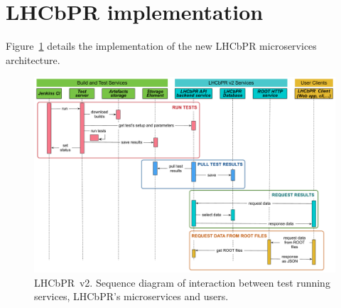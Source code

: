 \documentclass[10pt]{iopart}
\begin{document}
\section{LHCbPR implementation}\label{sec:impl}

Figure~\ref{figLHCbPR2}  details the implementation of the new LHCbPR microservices
architecture. 

\begin{figure}[H]
\begin{minipage}{\textwidth}
\includegraphics[width=\textwidth]{figs/LHCbPR2.pdf}
\caption{\label{figLHCbPR2} LHCbPR~v2. Sequence diagram of interaction between test
running services, LHCbPR's microservices and users.}
\end{minipage}
\end{figure}
\end{document}
